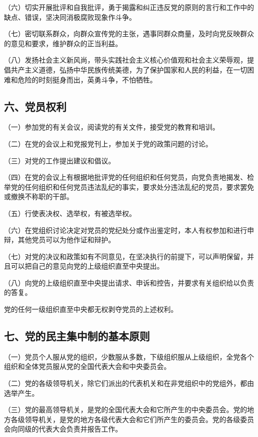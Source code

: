 \documentclass[UTF8,11pt,a4paper]{ctexart}
\begin{document}
\noindent （六）切实开展批评和自我批评，勇于揭露和纠正违反党的原则的言行和工作中的缺点、错误，坚决同消极腐败现象作斗争。

\noindent （七）密切联系群众，向群众宣传党的主张，遇事同群众商量，及时向党反映群众的意见和要求，维护群众的正当利益。

\noindent （八）发扬社会主义新风尚，带头实践社会主义核心价值观和社会主义荣辱观，提倡共产主义道德，弘扬中华民族传统美德，为了保护国家和人民的利益，在一切困难和危险的时刻挺身而出，英勇斗争，不怕牺牲。

\subsection*{六、党员权利}

\noindent （一）参加党的有关会议，阅读党的有关文件，接受党的教育和培训。

\noindent （二）在党的会议上和党报党刊上，参加关于党的政策问题的讨论。

\noindent （三）对党的工作提出建议和倡议。

\noindent （四）在党的会议上有根据地批评党的任何组织和任何党员，向党负责地揭发、检举党的任何组织和任何党员违法乱纪的事实，要求处分违法乱纪的党员，要求罢免或撤换不称职的干部。

\noindent （五）行使表决权、选举权，有被选举权。

\noindent （六）在党组织讨论决定对党员的党纪处分或作出鉴定时，本人有权参加和进行申辩，其他党员可以为他作证和辩护。

\noindent （七）对党的决议和政策如有不同意见，在坚决执行的前提下，可以声明保留，并且可以把自己的意见向党的上级组织直至中央提出。

\noindent （八）向党的上级组织直至中央提出请求、申诉和控告，并要求有关组织给以负责的答复。

党的任何一级组织直至中央都无权剥夺党员的上述权利。

\subsection*{七、党的民主集中制的基本原则}

\noindent （一）党员个人服从党的组织，少数服从多数，下级组织服从上级组织，全党各个组织和全体党员服从党的全国代表大会和中央委员会。

\noindent （二）党的各级领导机关，除它们派出的代表机关和在非党组织中的党组外，都由选举产生。

\noindent （三）党的最高领导机关，是党的全国代表大会和它所产生的中央委员会。党的地方各级领导机关，是党的地方各级代表大会和它们所产生的委员会。党的各级委员会向同级的代表大会负责并报告工作。
\end{document}
